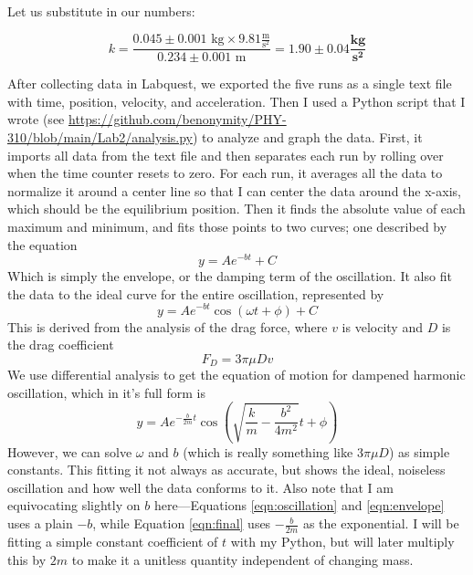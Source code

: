 \documentclass[12pt,letterpaper]{article}
\begin{document}
Let us substitute in our numbers:

\begin{equation*}
    k=\frac{0.045 \pm 0.001 \text{ kg} \times 9.81 \frac{\text{m}}{\text{s}^2}}{0.234 \pm 0.001 \text{ m}} = \mathbf{1.90 \pm 0.04} \frac{\textbf{kg}}{\textbf{s}^\mathbf{2}}
\end{equation*}

After collecting data in Labquest, we exported the five runs as a single text file with time, position, velocity, and acceleration. Then I used a Python script that I wrote (see \url{https://github.com/benonymity/PHY-310/blob/main/Lab2/analysis.py}) to analyze and graph the data. First, it imports all data from the text file and then separates each run by rolling over when the time counter resets to zero. For each run, it averages all the data to normalize it around a center line so that I can center the data around the x-axis, which should be the equilibrium position. Then it finds the absolute value of each maximum and minimum, and fits those points to two curves; one described by the equation
\begin{equation}
    y=Ae^{-bt} + C
\label{eqn:envelope}
\end{equation}
Which is simply the envelope, or the damping term of the oscillation. It also fit the data to the ideal curve for the entire oscillation, represented by
\begin{equation}
    y=Ae^{-bt} \cos \left(\omega t + \phi\right) + C
\label{eqn:oscillation}
\end{equation}
This is derived from the analysis of the drag force, where $v$ is velocity and $D$ is the drag coefficient
\begin{equation}
    \label{eqn:drag}
    F_D=3\pi \mu Dv
\end{equation}
We use differential analysis to get the equation of motion for dampened harmonic oscillation, which in it's full form is
\begin{equation}
\label{eqn:final}
    y=Ae^{-\frac{b}{2m}t} \cos \left(\sqrt{\frac{k}{m} - \frac{b^2}{4m^2}} t + \phi\right)
\end{equation}
However, we can solve $\omega$ and $b$ (which is really something like $3\pi \mu D$) as simple constants. This fitting it not always as accurate, but shows the ideal, noiseless oscillation and how well the data conforms to it. Also note that I am equivocating slightly on $b$ here—Equations \ref{eqn:oscillation} and \ref{eqn:envelope} uses a plain $-b$, while Equation \ref{eqn:final} uses $-\frac{b}{2m}$ as the exponential. I will be fitting a simple constant coefficient of $t$ with my Python, but will later multiply this by $2m$ to make it a unitless quantity independent of changing mass.
\end{document}
